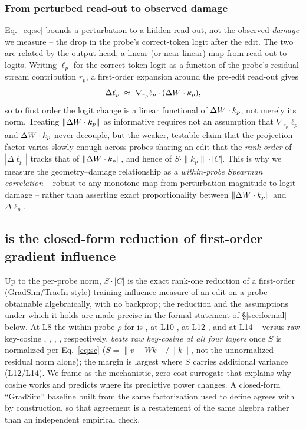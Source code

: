 \subsubsection{From perturbed read-out to observed damage}
Eq.~\ref{eq:sc} bounds a perturbation to a hidden read-out, not the observed
\emph{damage} we measure -- the drop in the probe's correct-token logit after
the edit. The two are related by the output head, a linear (or near-linear)
map from read-out to logits. Writing $\ell_p$ for the correct-token logit as a
function of the probe's residual-stream contribution $r_p$, a first-order
expansion around the pre-edit read-out gives
\[
\Delta \ell_p \;\approx\; \nabla_{r_p}\ell_p \cdot (\Delta W\cdot k_p),
\]
so to first order the logit change is a linear functional of $\Delta W\cdot k_p$,
not merely its norm. Treating $\|\Delta W\cdot k_p\|$ as informative requires not an
assumption that $\nabla_{r_p}\ell_p$ and $\Delta W\cdot k_p$ never decouple, but the
weaker, testable claim that the projection factor varies slowly enough across
probes sharing an edit that the \emph{rank order} of $|\Delta\ell_p|$ tracks
that of $\|\Delta W\cdot k_p\|$, and hence of $S\cdot\|k_p\|\cdot|C|$. This is why we
measure the geometry--damage relationship as a \emph{within-probe Spearman
correlation} -- robust to any monotone map from perturbation magnitude to
logit damage -- rather than asserting exact proportionality between
$\|\Delta W\cdot k_p\|$ and $\Delta\ell_p$.

\subsection{\texorpdfstring{\SxC}{SxC} is the closed-form reduction of
first-order gradient influence}
Up to the per-probe norm, $S\cdot|C|$ is the exact rank-one reduction of a
first-order (GradSim/TracIn-style) training-influence measure
\citep{pruthi2020gradsim} of an edit on a probe -- obtainable algebraically,
with no backprop; the reduction and the assumptions under which it holds are
made precise in the formal statement of \S\ref{sec:formal} below. At L8 the within-probe $\rho$ for \SxC{} is
\scRhoLeight{}, at L10 \scRhoLten{}, at L12 \scRhoLtwelve{}, and at L14
\scRhoLfourteen{} -- versus raw key-cosine \gWithinLeight{}, \gWithinLten{},
\gWithinLtwelve{}, \gWithinLfourteen{}, respectively. \emph{\SxC{} beats raw
key-cosine at all four layers} once $S$ is normalized per Eq.~\ref{eq:sc}
($S=\|v-Wk\|/\|k\|$, not the unnormalized residual norm alone); the margin is
largest where $S$ carries additional variance (L12/L14). We frame \SxC{} as
the mechanistic, zero-cost surrogate that explains why cosine works and
predicts where its predictive power changes. A closed-form ``GradSim''
baseline built from the same factorization used to define \SxC{} agrees with
\SxC{} by construction, so that agreement is a restatement of the same algebra
rather than an independent empirical check.

